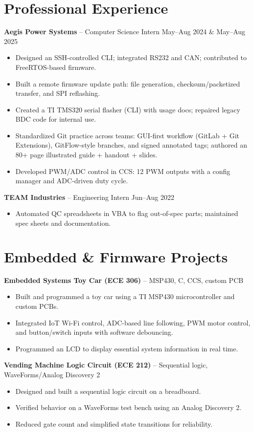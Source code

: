 \documentclass[10pt,letterpaper]{article}
\begin{document}
\section*{Professional Experience}
\textbf{Aegis Power Systems} -- Computer Science Intern \hfill May--Aug 2024 \& May--Aug 2025
\begin{itemize}
  \item Designed an SSH-controlled CLI; integrated RS232 and CAN; contributed to FreeRTOS-based firmware.
  \item Built a remote firmware update path: file generation, checksum/packetized transfer, and SPI reflashing.
  \item Created a TI TMS320 serial flasher (CLI) with usage docs; repaired legacy BDC code for internal use.
  \item Standardized Git practice across teams: GUI-first workflow (GitLab + Git Extensions), GitFlow-style branches, and signed annotated tags; authored an 80+ page illustrated guide + handout + slides.
  \item Developed PWM/ADC control in CCS: 12 PWM outputs with a config manager and ADC-driven duty cycle.
\end{itemize}

\textbf{TEAM Industries} -- Engineering Intern \hfill Jun--Aug 2022
\begin{itemize}
  \item Automated QC spreadsheets in VBA to flag out-of-spec parts; maintained spec sheets and documentation.
\end{itemize}

\section*{Embedded \& Firmware Projects}
\textbf{Embedded Systems Toy Car (ECE 306)} -- MSP430, C, CCS, custom PCB
\begin{itemize}
  \item Built and programmed a toy car using a TI MSP430 microcontroller and custom PCBs.
  \item Integrated IoT Wi-Fi control, ADC-based line following, PWM motor control, and button/switch inputs with software debouncing.
  \item Programmed an LCD to display essential system information in real time.
\end{itemize}

\textbf{Vending Machine Logic Circuit (ECE 212)} -- Sequential logic, WaveForms/Analog Discovery 2
\begin{itemize}
  \item Designed and built a sequential logic circuit on a breadboard.
  \item Verified behavior on a WaveForms test bench using an Analog Discovery 2.
  \item Reduced gate count and simplified state transitions for reliability.
\end{itemize}
\end{document}
